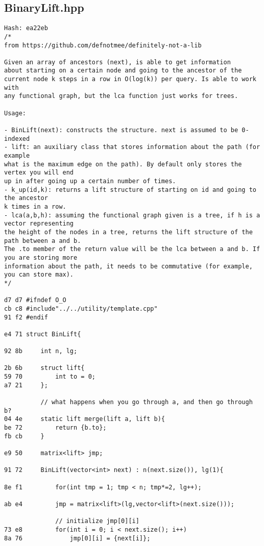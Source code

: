 \documentclass[11pt, a4paper, twoside]{article}
\begin{document}
\subsection{BinaryLift.hpp}
\begin{lstlisting}
Hash: ea22eb
/*
from https://github.com/defnotmee/definitely-not-a-lib

Given an array of ancestors (next), is able to get information
about starting on a certain node and going to the ancestor of the
current node k steps in a row in O(log(k)) per query. Is able to work with
any functional graph, but the lca function just works for trees.

Usage: 

- BinLift(next): constructs the structure. next is assumed to be 0-indexed
- lift: an auxiliary class that stores information about the path (for example
what is the maximum edge on the path). By default only stores the vertex you will end
up in after going up a certain number of times.
- k_up(id,k): returns a lift structure of starting on id and going to the ancestor
k times in a row. 
- lca(a,b,h): assuming the functional graph given is a tree, if h is a vector representing
the height of the nodes in a tree, returns the lift structure of the path between a and b.
The .to member of the return value will be the lca between a and b. If you are storing more
information about the path, it needs to be commutative (for example, you can store max).
*/

d7 d7 #ifndef O_O
cb c8 #include"../../utility/template.cpp"
91 f2 #endif

e4 71 struct BinLift{
          
92 8b     int n, lg;
      
2b 6b     struct lift{
59 70         int to = 0;
a7 21     };
      
          // what happens when you go through a, and then go through b?
04 4e     static lift merge(lift a, lift b){
be 72         return {b.to};
fb cb     }
      
e9 50     matrix<lift> jmp;
      
91 72     BinLift(vector<int> next) : n(next.size()), lg(1){
      
8e f1         for(int tmp = 1; tmp < n; tmp*=2, lg++);
      
ab e4         jmp = matrix<lift>(lg,vector<lift>(next.size()));
              
              // initialize jmp[0][i]
73 e8         for(int i = 0; i < next.size(); i++)
8a 76             jmp[0][i] = {next[i]};
      

\end{lstlisting}
\end{document}
